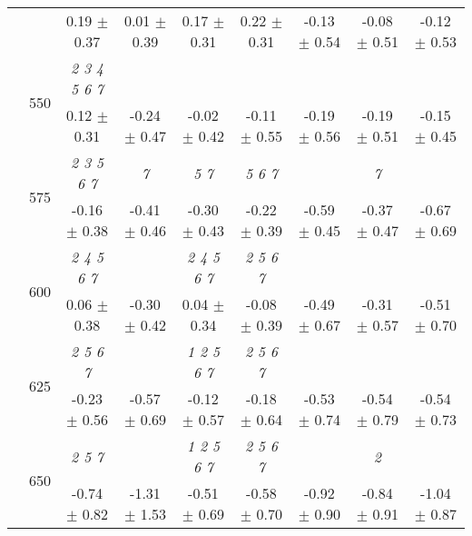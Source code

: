 \begin{table}[h]
{\begin{tabular}{
        ccccccccc}
 & & \cellcolor[HTML]{EFEFEF} 0.19 $\pm$ 0.37& \cellcolor[HTML]{EFEFEF} 0.01 $\pm$ 0.39& \cellcolor[HTML]{EFEFEF} 0.17 $\pm$ 0.31& \cellcolor[HTML]{EFEFEF} 0.22 $\pm$ 0.31& \cellcolor[HTML]{EFEFEF} -0.13 $\pm$ 0.54& \cellcolor[HTML]{EFEFEF} -0.08 $\pm$ 0.51& \cellcolor[HTML]{EFEFEF} -0.12 $\pm$ 0.53 \\ 
 & \multirow{2}{*}{550}& \textit{ 2 3 4 5 6 7 }& & & & & &  \\ 
 & & 0.12 $\pm$ 0.31& -0.24 $\pm$ 0.47& -0.02 $\pm$ 0.42& -0.11 $\pm$ 0.55& -0.19 $\pm$ 0.56& -0.19 $\pm$ 0.51& -0.15 $\pm$ 0.45 \\ 
 & \multirow{2}{*}{575}& \cellcolor[HTML]{EFEFEF} \textit{ 2 3 5 6 7 }& \cellcolor[HTML]{EFEFEF} \textit{ 7 }& \cellcolor[HTML]{EFEFEF} \textit{ 5 7 }& \cellcolor[HTML]{EFEFEF} \textit{ 5 6 7 }& \cellcolor[HTML]{EFEFEF} & \cellcolor[HTML]{EFEFEF} \textit{ 7 }& \cellcolor[HTML]{EFEFEF}  \\ 
 & & \cellcolor[HTML]{EFEFEF} -0.16 $\pm$ 0.38& \cellcolor[HTML]{EFEFEF} -0.41 $\pm$ 0.46& \cellcolor[HTML]{EFEFEF} -0.30 $\pm$ 0.43& \cellcolor[HTML]{EFEFEF} -0.22 $\pm$ 0.39& \cellcolor[HTML]{EFEFEF} -0.59 $\pm$ 0.45& \cellcolor[HTML]{EFEFEF} -0.37 $\pm$ 0.47& \cellcolor[HTML]{EFEFEF} -0.67 $\pm$ 0.69 \\ 
 & \multirow{2}{*}{600}& \textit{ 2 4 5 6 7 }& & \textit{ 2 4 5 6 7 }& \textit{ 2 5 6 7 }& & &  \\ 
 & & 0.06 $\pm$ 0.38& -0.30 $\pm$ 0.42& 0.04 $\pm$ 0.34& -0.08 $\pm$ 0.39& -0.49 $\pm$ 0.67& -0.31 $\pm$ 0.57& -0.51 $\pm$ 0.70 \\ 
 & \multirow{2}{*}{625}& \cellcolor[HTML]{EFEFEF} \textit{ 2 5 6 7 }& \cellcolor[HTML]{EFEFEF} & \cellcolor[HTML]{EFEFEF} \textit{ 1 2 5 6 7 }& \cellcolor[HTML]{EFEFEF} \textit{ 2 5 6 7 }& \cellcolor[HTML]{EFEFEF} & \cellcolor[HTML]{EFEFEF} & \cellcolor[HTML]{EFEFEF}  \\ 
 & & \cellcolor[HTML]{EFEFEF} -0.23 $\pm$ 0.56& \cellcolor[HTML]{EFEFEF} -0.57 $\pm$ 0.69& \cellcolor[HTML]{EFEFEF} -0.12 $\pm$ 0.57& \cellcolor[HTML]{EFEFEF} -0.18 $\pm$ 0.64& \cellcolor[HTML]{EFEFEF} -0.53 $\pm$ 0.74& \cellcolor[HTML]{EFEFEF} -0.54 $\pm$ 0.79& \cellcolor[HTML]{EFEFEF} -0.54 $\pm$ 0.73 \\ 
 & \multirow{2}{*}{650}& \textit{ 2 5 7 }& & \textit{ 1 2 5 6 7 }& \textit{ 2 5 6 7 }& & \textit{ 2 }&  \\ 
 & & -0.74 $\pm$ 0.82& -1.31 $\pm$ 1.53& -0.51 $\pm$ 0.69& -0.58 $\pm$ 0.70& -0.92 $\pm$ 0.90& -0.84 $\pm$ 0.91& -1.04 $\pm$ 0.87 \\ \midrule 

\end{tabular}}
\end{table}

